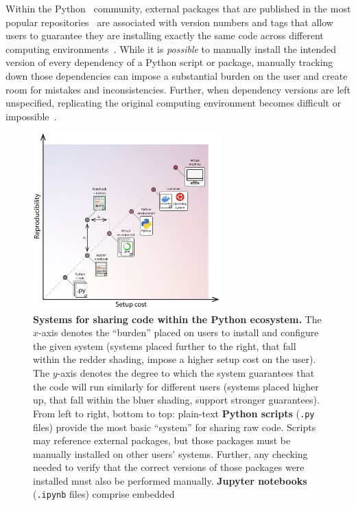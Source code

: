 \documentclass[preprint,12pt,a4paper]{elsarticle}
\begin{document}
Within the Python~\cite{vanR95} community, external packages that are
published in the most popular repositories~\cite{Pyth03, cond15} are
associated with version numbers and tags that allow users to guarantee
they are installing exactly the same code across different computing
environments~\cite{CoghStuf13}.  While it is \textit{possible} to
manually install the intended version of every dependency of a Python
script or package, manually tracking down those dependencies can
impose a substantial burden on the user and create room for mistakes
and inconsistencies. Further, when dependency versions are left
unspecified, replicating the original computing environment becomes
difficult or impossible~\citep{PimeEtal19}.

\begin{figure}[tp]
\centering
\includegraphics[width=0.65\textwidth]{figs/shareable_code_2d}
\caption{\small \textbf{Systems for sharing code within the Python
  ecosystem.}  The $x$-axis denotes the ``burden'' placed on users to
  install and configure the given system (systems placed further to the right, that fall within the redder shading, impose a higher setup cost on the user).  The $y$-axis denotes the
  degree to which the system guarantees that the code will run
  similarly for different users (systems placed higher up, that fall within the bluer shading, support stronger guarantees).
  From left to right, bottom to top: plain-text \textbf{Python
  scripts} (\texttt{.py} files) provide the most basic ``system''
  for sharing raw code.  Scripts may reference external packages, but
  those packages must be manually installed on other users' systems.
  Further, any checking needed to verify that the correct versions of
  those packages were installed must also be performed manually.
  \textbf{Jupyter notebooks} (\texttt{.ipynb} files) comprise embedded
}
\end{figure}
\end{document}

